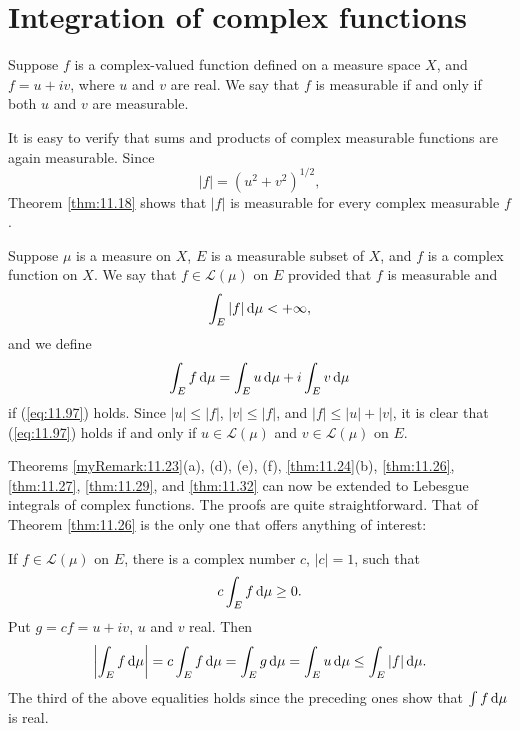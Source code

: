 
\section{Integration of complex functions}

Suppose $f$ is a complex-valued function defined on a measure space $X$, 
and $f = u + iv$, 
where $u$ and $v$ are real. 
We say that $f$ is measurable if and only if
both $u$ and $v$ are measurable.

It is easy to verify that sums and products of complex measurable functions
are again measurable. Since
\begin{equation*}
    \left| f \right| = (u^2 + v^2)^{1/2},
\end{equation*}
Theorem \ref{thm:11.18} shows that $|f|$ is measurable for every complex measurable $f$.

Suppose $\mu$ is a measure on $X$, 
$E$ is a measurable subset of $X$, 
and $f$ is a complex function on $X$. 
We say that $f \in \mathscr{L}(\mu)$ on $E$ provided that $f$ is measurable
and 
\begin{equation}
    \label{eq:11.97}
    \int_E \left| f \right| \d \mu < +\infty ,
\end{equation}
and we define 
\begin{equation*}
    \int_E f \d \mu =
    \int_E u \d \mu + i
    \int_E v \d \mu
\end{equation*}
if (\ref{eq:11.97}) holds. 
Since $|u| \leq |f|$, $|v| \leq |f|$, and $|f | \leq | u | + | v |$, 
it is clear that
(\ref{eq:11.97}) holds if and only if $u \in \mathscr{L}(\mu)$ and $v \in \mathscr{L}(\mu)$ on $E$.

Theorems \ref{myRemark:11.23}(a), (d), (e), (f), \ref{thm:11.24}(b), \ref{thm:11.26}, \ref{thm:11.27}, \ref{thm:11.29}, and \ref{thm:11.32}
can now be extended to Lebesgue integrals of complex functions. 
The proofs are quite straightforward. 
That of Theorem \ref{thm:11.26} is the only one that offers
anything of interest:

If $f \in \mathscr{L}(\mu)$ on $E$, there is a complex number $c$, $|c| = 1$, such that 
\begin{equation*}
    c \int_E f \d \mu \geq 0 .
\end{equation*}
Put $g = cf = u + iv$, $u$ and $v$ real.
Then 
\begin{equation*}
    \left| \int_E f \d \mu \right| = 
    c \int_E f \d \mu =
    \int_E g \d \mu =
    \int_E u \d \mu \leq 
    \int_E | f | \d \mu .
\end{equation*}
The third of the above equalities holds since the preceding ones show that
$\int f \d \mu$ is real.
